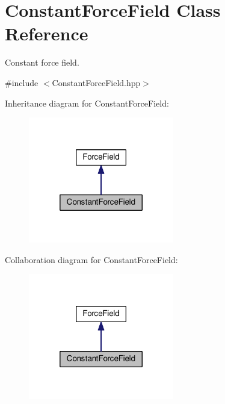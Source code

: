 \hypertarget{classConstantForceField}{\section{Constant\+Force\+Field Class Reference}
\label{classConstantForceField}
}


Constant force field.  




{\ttfamily \#include $<$Constant\+Force\+Field.\+hpp$>$}



Inheritance diagram for Constant\+Force\+Field\+:\nopagebreak
\begin{figure}[H]
\begin{center}
\leavevmode
\includegraphics[width=180pt]{classConstantForceField__inherit__graph}
\end{center}
\end{figure}


Collaboration diagram for Constant\+Force\+Field\+:\nopagebreak
\begin{figure}[H]
\begin{center}
\leavevmode
\includegraphics[width=180pt]{classConstantForceField__coll__graph}
\end{center}
\end{figure}

